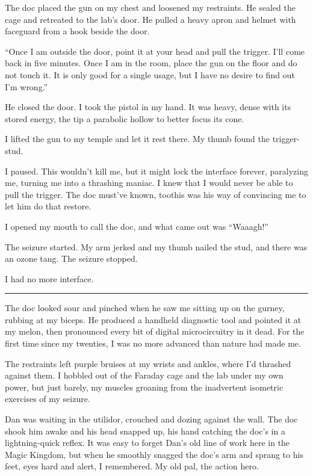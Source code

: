 The doc placed the gun on my chest and loosened my restraints. He
sealed the cage and retreated to the lab's door. He pulled a heavy
apron and helmet with faceguard from a hook beside the door.

“Once I am outside the door, point it at your head and pull the
trigger. I'll come back in five minutes. Once I am in the room,
place the gun on the floor and do not touch it. It is only good for
a single usage, but I have no desire to find out I'm wrong.”

He closed the door. I took the pistol in my hand. It was heavy,
dense with its stored energy, the tip a parabolic hollow to better
focus its cone.

I lifted the gun to my temple and let it rest there. My thumb found
the trigger-stud.

I paused. This wouldn't kill me, but it might lock the interface
forever, paralyzing me, turning me into a thrashing maniac. I knew
that I would never be able to pull the trigger. The doc must've
known, too{\dash}this was his way of convincing me to let him do that
restore.

I opened my mouth to call the doc, and what came out was “Waaagh!”

The seizure started. My arm jerked and my thumb nailed the stud,
and there was an ozone tang. The seizure stopped.

I had no more interface.

\begin{center}\rule{3in}{0.4pt}\end{center}

The doc looked sour and pinched when he saw me sitting up on the
gurney, rubbing at my biceps. He produced a handheld diagnostic
tool and pointed it at my melon, then pronounced every bit of
digital microcircuitry in it dead. For the first time since my
twenties, I was no more advanced than nature had made me.

The restraints left purple bruises at my wrists and ankles, where
I'd thrashed against them. I hobbled out of the Faraday cage and
the lab under my own power, but just barely, my muscles groaning
from the inadvertent isometric exercises of my seizure.

Dan was waiting in the utilidor, crouched and dozing against the
wall. The doc shook him awake and his head snapped up, his hand
catching the doc's in a lightning-quick reflex. It was easy to
forget Dan's old line of work here in the Magic Kingdom, but when
he smoothly snagged the doc's arm and sprang to his feet, eyes hard
and alert, I remembered. My old pal, the action hero.

